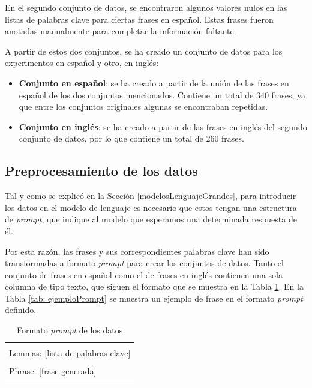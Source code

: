 \documentclass[11pt,spanish,listoffigures,listoftables]{tfgetsinf}
\begin{document}
En el segundo conjunto de datos, se encontraron algunos valores nulos en las listas de palabras clave para ciertas frases en español. Estas frases fueron anotadas manualmente para completar la información faltante.

A partir de estos dos conjuntos, se ha creado un conjunto de datos para los experimentos en español y otro, en inglés:

\begin{itemize}
	\item \textbf{Conjunto en español}: se ha creado a partir de la unión de las frases en español de los dos conjuntos mencionados. Contiene un total de 340 frases, ya que entre los conjuntos originales algunas se encontraban repetidas.
	\item \textbf {Conjunto en inglés}: se ha creado a partir de las frases en inglés del segundo conjunto de datos, por lo que contiene un total de 260 frases.
\end{itemize}

\subsection{Preprocesamiento de los datos}

Tal y como se explicó en la Sección \ref{modelosLenguajeGrandes}, para introducir los datos en el modelo de lenguaje es necesario que estos tengan una estructura de \textit{prompt}, que indique al modelo que esperamos una determinada respuesta de él.

Por esta razón, las frases y sus correspondientes palabras clave han sido transformadas a formato \textit{prompt} para crear los conjuntos de datos. Tanto el conjunto de frases en español como el de frases en inglés contienen una sola columna de tipo texto, que siguen el formato que se muestra en la Tabla \ref{tab: formatoPrompt}. En la Tabla \ref{tab: ejemploPrompt} se muestra un ejemplo de frase en el formato \textit{prompt} definido.

\begin{table}[!h]
\caption{Formato \textit{prompt} de los datos}
\begin{center}
\begin{tabular}{ | l | }
\hline
	\\
	Lemmas: [lista de palabras clave] \\
	\\
	Phrase: [frase generada] \\
	\\
\hline
\end{tabular}
\end{center}
\label{tab: formatoPrompt}
\end{table}
\end{document}

